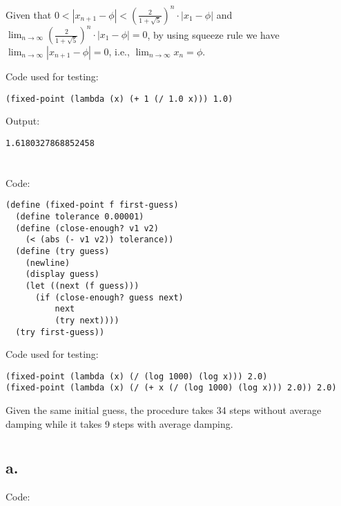 \documentclass[../main.tex]{subfiles}
\begin{document}
Given that $0<|x_{n+1}-\phi|<\left(\frac{2}{1+\sqrt{5}}\right)^n\cdot|x_1 - \phi|$ and $\lim_{n\to\infty}\left(\frac{2}{1+\sqrt{5}}\right)^n\cdot|x_1 - \phi|=0$, by using squeeze rule we have $\lim_{n\to\infty}|x_{n+1}-\phi|=0$, i.e., $\lim_{n\to\infty}x_n=\phi$.

Code used for testing:

\begin{lstlisting}
(fixed-point (lambda (x) (+ 1 (/ 1.0 x))) 1.0)
\end{lstlisting}

Output:

\begin{lstlisting}
1.6180327868852458
\end{lstlisting}


\section{}

Code:

\begin{lstlisting}
(define (fixed-point f first-guess)
  (define tolerance 0.00001)
  (define (close-enough? v1 v2)
    (< (abs (- v1 v2)) tolerance))
  (define (try guess)
    (newline)
    (display guess)
    (let ((next (f guess)))
      (if (close-enough? guess next)
          next
          (try next))))
  (try first-guess))
\end{lstlisting}

Code used for testing:

\begin{lstlisting}
(fixed-point (lambda (x) (/ (log 1000) (log x))) 2.0)
(fixed-point (lambda (x) (/ (+ x (/ (log 1000) (log x))) 2.0)) 2.0)
\end{lstlisting}

Given the same initial guess, the procedure takes 34 steps without
 average damping while it takes 9 steps with average damping.


\section{}

\subsection*{a.}

Code:
\end{document}
